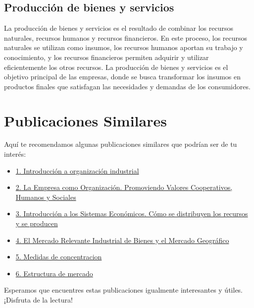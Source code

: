 \documentclass[
  letterpaper,
  DIV=11,
  numbers=noendperiod]{scrartcl}
\begin{document}
\hypertarget{producciuxf3n-de-bienes-y-servicios}{%
\subsection{Producción de bienes y
servicios}\label{producciuxf3n-de-bienes-y-servicios}}

La producción de bienes y servicios es el resultado de combinar los
recursos naturales, recursos humanos y recursos financieros. En este
proceso, los recursos naturales se utilizan como insumos, los recursos
humanos aportan su trabajo y conocimiento, y los recursos financieros
permiten adquirir y utilizar eficientemente los otros recursos. La
producción de bienes y servicios es el objetivo principal de las
empresas, donde se busca transformar los insumos en productos finales
que satisfagan las necesidades y demandas de los consumidores.

\hypertarget{publicaciones-similares}{%
\section{Publicaciones Similares}\label{publicaciones-similares}}

Aquí te recomendamos algunas publicaciones similares que podrían ser de
tu interés:

\begin{itemize}
\item
  \href{../2023-06-12-introducion-organizacion-industrial/index.qmd}{1.
  Introducción a organización industrial}
\item
  \href{../2023-06-13-empresa-como-organizacion/index.qmd}{2. La Empresa
  como Organización. Promoviendo Valores Cooperativos, Humanos y
  Sociales}
\item
  \href{../2023-06-13-sistemas-economicos/index.qmd}{3. Introducción a
  los Sistemas Económicos. Cómo se distribuyen los recursos y se
  producen}
\item
  \href{../2023-06-15-mercado-relevante-oi-cap-2/index.qmd}{4. El
  Mercado Relevante Industrial de Bienes y el Mercado Geográfico}
\item
  \href{../2023-06-16-concentracion-poder-oi-cap3/index.qmd}{5. Medidas
  de concentracion}
\item
  \href{../2023-06-17-estructura-mercado-oi-cap4/index.qmd}{6.
  Estructura de mercado}
\end{itemize}

Esperamos que encuentres estas publicaciones igualmente interesantes y
útiles. ¡Disfruta de la lectura!


\printbibliography
\end{document}
